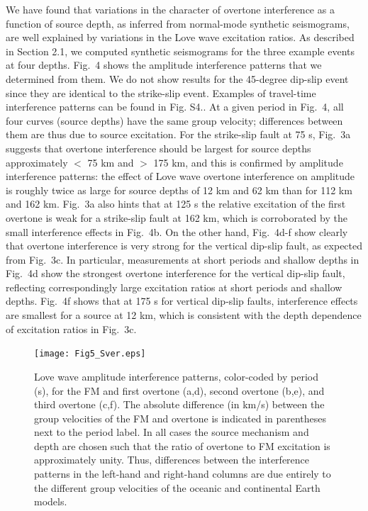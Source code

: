 \documentclass[extra,mreferee]{gji}
\begin{document}
We have found that variations in the character of overtone interference as a function of source depth, as inferred from normal-mode synthetic seismograms, are well explained by variations in the Love wave excitation ratios. As described in Section 2.1, we computed synthetic seismograms for the three example events at four depths. Fig.\ 4 shows the amplitude interference patterns that we determined from them. We do not show results for the 45-degree dip-slip event since they are identical to the strike-slip event. Examples of travel-time interference patterns can be found in Fig. S4.. At a given period in Fig.\ 4, all four curves (source depths) have the same group velocity; differences between them are thus due to source excitation. For the strike-slip fault at 75 s, Fig.\ 3a suggests that overtone interference should be largest for source depths approximately $<$ 75 km and $>$ 175 km, and this is confirmed by amplitude interference patterns: the effect of Love wave overtone interference on amplitude is roughly twice as large for source depths of 12 km and 62 km than for 112 km and 162 km. Fig.\ 3a also hints that at 125 s the relative excitation of the first overtone is weak for a strike-slip fault at 162 km, which is corroborated by the small interference effects in Fig.\ 4b. On the other hand, Fig.\ 4d-f show clearly that overtone interference is very strong for the vertical dip-slip fault, as expected from Fig.\ 3c. In particular, measurements at short periods and shallow depths in Fig.\ 4d show the strongest overtone interference for the vertical dip-slip fault, reflecting correspondingly large excitation ratios at short periods and shallow depths. Fig.\ 4f shows that at 175 s for vertical dip-slip faults, interference effects are smallest for a source at 12 km, which is consistent with the depth dependence of excitation ratios in Fig.\ 3c. 

 \begin{figure}
 \texttt{[image: Fig5\_Sver.eps]}
 \caption{Love wave amplitude interference patterns, color-coded by period (s), for the FM and first overtone (a,d), second overtone (b,e), and third overtone (c,f). The absolute difference (in km/s) between the group velocities of the FM and overtone is indicated in parentheses next to the period label. In all cases the source mechanism and depth are chosen such that the ratio of overtone to FM excitation is approximately unity. Thus, differences between the interference patterns in the left-hand and right-hand columns are due entirely to the different group velocities of the oceanic and continental Earth models. }
 \end{figure}
 
\end{document}
